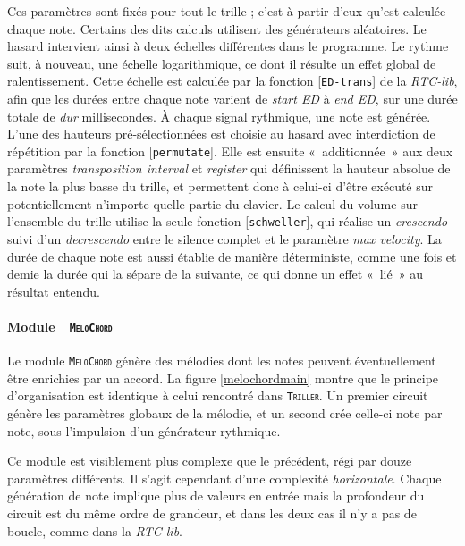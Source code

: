 \documentclass[a4paper,12pt]{article}
\newcommand{\guill}[1]{«~#1~»}
\newcommand{\module}[1]{\texttt{\textsc{#1}}}
\newcommand{\patch}[1]{[\texttt{#1}]}
\begin{document}
Ces paramètres sont fixés pour tout le trille ; c'est à partir d'eux qu'est calculée chaque note. Certains des dits calculs utilisent des générateurs aléatoires. Le hasard intervient ainsi à deux échelles différentes dans le programme. Le rythme suit, à nouveau, une échelle logarithmique, ce dont il résulte un effet global de ralentissement. Cette échelle est calculée par la fonction \patch{ED-trans} de la \emph{RTC-lib}, afin que les durées entre chaque note varient de \emph{start ED} à \emph{end ED}, sur une durée totale de \emph{dur} millisecondes. À chaque signal rythmique, une note est générée. L'une des hauteurs pré-sélectionnées est choisie au hasard avec interdiction de répétition par la fonction \patch{permutate}. Elle est ensuite \guill{additionnée} aux deux paramètres \emph{transposition interval} et \emph{register} qui définissent la hauteur absolue de la note la plus basse du trille, et permettent donc à celui-ci d'être exécuté sur potentiellement n'importe quelle partie du clavier. Le calcul du volume sur l'ensemble du trille utilise la seule fonction \patch{schweller}, qui réalise un \emph{crescendo} suivi d'un \emph{decrescendo} entre le silence complet et le paramètre \emph{max velocity}. La durée de chaque note est aussi établie de manière déterministe, comme une fois et demie la durée qui la sépare de la suivante, ce qui donne un effet \guill{lié} au résultat entendu.

\paragraph{Module~~\textnormal{\module{MeloChord}} \\}

Le module \module{MeloChord} génère des mélodies dont les notes peuvent éventuellement être enrichies par un accord. La figure \ref{melochordmain} montre que le principe d'organisation est identique à celui rencontré dans \module{Triller}. Un premier circuit génère les paramètres globaux de la mélodie, et un second crée celle-ci note par note, sous l'impulsion d'un générateur rythmique.

Ce module est visiblement plus complexe que le précédent, régi par douze paramètres différents. Il s'agit cependant d'une complexité \emph{horizontale}. Chaque génération de note implique plus de valeurs en entrée mais la profondeur du circuit est du même ordre de grandeur, et dans les deux cas il n'y a pas de boucle, comme dans la \emph{RTC-lib}.
\end{document}

